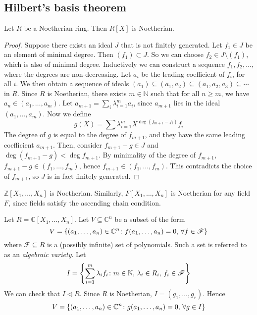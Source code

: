 \subsection{Hilbert's basis theorem}
\begin{theorem}
	Let \( R \) be a Noetherian ring.
	Then \( R[X] \) is Noetherian.
\end{theorem}
\begin{proof}
	Suppose there exists an ideal \( J \) that is not finitely generated.
	Let \( f_1 \in J \) be an element of minimal degree.
	Then \( (f_1) \subset J \).
	So we can choose \( f_2 \in J \setminus (f_1) \), which is also of minimal degree.
	Inductively we can construct a sequence \( f_1, f_2, \dots \), where the degrees are non-decreasing.
	Let \( a_i \) be the leading coefficient of \( f_i \), for all \( i \).
	We then obtain a sequence of ideals \( (a_1) \subseteq (a_1, a_2) \subseteq (a_1, a_2, a_3) \subseteq \cdots \) in \( R \).
	Since \( R \) is Noetherian, there exists \( m \in \mathbb N \) such that for all \( n \geq m \), we have \( a_{n} \in (a_1, \dots, a_m) \).
	Let \( a_{m+1} = \sum_i \lambda_{i=1}^m a_i \), since \( a_{m+1} \) lies in the ideal \( (a_1, \dots, a_m) \).
	Now we define
	\[ g(X) = \sum \lambda_{i=1}^m X^{\deg (f_{m+1} - f_i)} f_i \]
	The degree of \( g \) is equal to the degree of \( f_{m+1} \), and they have the same leading coefficient \( a_{m+1} \).
	Then, consider \( f_{m+1} - g \in J \) and \( \deg (f_{m+1} - g) < \deg f_{m+1} \).
	By minimality of the degree of \( f_{m+1} \), \( f_{m+1} - g \in (f_1, \dots, f_m) \), hence \( f_{m+1} \in (f_1, \dots, f_m) \).
	This contradicts the choice of \( f_{m+1} \), so \( J \) is in fact finitely generated.
\end{proof}
\begin{corollary}
	\( \mathbb Z[X_1, \dots, X_n] \) is Noetherian.
	Similarly, \( F[X_1, \dots, X_n] \) is Noetherian for any field \( F \), since fields satisfy the ascending chain condition.
\end{corollary}
\begin{example}
	Let \( R = \mathbb C[X_1, \dots, X_n] \).
	Let \( V \subseteq \mathbb C^n \) be a subset of the form
	\[ V = \qty{(a_1, \dots, a_n) \in \mathbb C^n \colon f(a_1, \dots, a_n) = 0,\,\forall f \in \mathscr F} \]
	where \( \mathscr F \subseteq R \) is a (possibly infinite) set of polynomials.
	Such a set is referred to as an \textit{algebraic variety}.
	Let
	\[ I = \qty{\sum_{i=1}^m \lambda_i f_i \colon m \in \mathbb N,\, \lambda_i \in R_i,\, f_i \in \mathscr F} \]
	We can check that \( I \triangleleft R \).
	Since \( R \) is Noetherian, \( I = (g_1, \dots, g_r) \).
	Hence
	\[ V = \qty{(a_1, \dots, a_n) \in \mathbb C^n \colon g(a_1, \dots, a_n) = 0,\,\forall g \in I} \]
\end{example}
